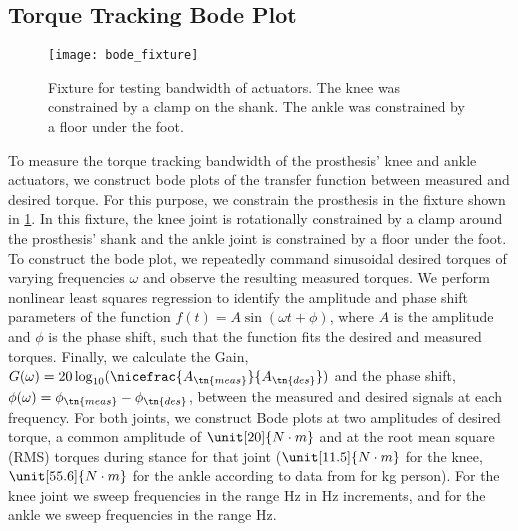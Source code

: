 \subsection{Torque Tracking Bode Plot}
\begin{figure}[htb]
\centerline{\texttt{[image: bode\_fixture]}}
\caption[Fixture for testing bandwidth of actuators]{Fixture for testing
bandwidth of actuators. The knee was constrained by a clamp on the shank. The
ankle was constrained by a floor under the foot.}\label{fig:bode_fixture}
\end{figure}
To measure the torque tracking bandwidth of the prosthesis' knee and ankle
actuators, we construct bode plots of the transfer function between measured and
desired torque. For this purpose, we constrain the prosthesis in the fixture
shown in \cref{fig:bode_fixture}. In this fixture, the knee joint is
rotationally constrained by a clamp around the prosthesis' shank and the ankle
joint is constrained by a floor under the foot. To construct the bode plot, we
repeatedly command sinusoidal desired torques of varying frequencies $\omega$
and observe the resulting measured torques. We perform nonlinear least squares
regression to identify the amplitude and phase shift parameters of the function
$f(t) = A \sin(\omega t + \phi)$, where $A$ is the amplitude and $\phi$ is the
phase shift, such that the function fits the desired and measured torques.
Finally, we calculate the Gain, $G(\omega) = 20 \log_{10}
(\nicefrac{A_\tn{meas}}{A_\tn{des}})$ and the phase shift, $\phi(\omega) =
\phi_\tn{meas} - \phi_\tn{des}$, between the measured and desired signals at
each frequency. For both joints, we construct Bode plots at two amplitudes of
desired torque, a common amplitude of $\unit[20]{N \cdot m}$ and at the root
mean square (RMS) torques during stance for that joint ($\unit[11.5]{N \cdot m}$
for the knee, $\unit[55.6]{N \cdot m}$ for the ankle according to data from
\citet{bovi2011multiple} for \unit[80]{kg} person). For the knee joint we sweep
frequencies in the range \unit[1-35]{Hz} in \unit[1]{Hz} increments, and for the
ankle we sweep frequencies in the range \unit[1-20]{Hz}.

